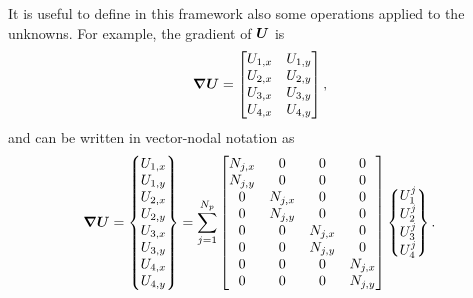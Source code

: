 \documentclass[a4paper,10pt]{article}
\newcommand{\bm}[1]{\text{\boldmath$#1$\unboldmath}}
\newcommand{\Grad}{\bm{\nabla}}
\newcommand{\DiscFunc}[1]{\bm{#1}}
\renewcommand{\u}{\DiscFunc{U}}
\begin{document}
It is useful to define in this framework also some operations applied to the unknowns. For example, the gradient of $\u$ is 
\[
 \Grad \u =\begin{bmatrix}
 U_{1,x} & U_{1,y}\\
 U_{2,x} & U_{2,y}\\
 U_{3,x} & U_{3,y}\\
 U_{4,x} & U_{4,y}
\end{bmatrix},
\]
and can be written in vector-nodal notation as 
\[
 \Grad \u =\begin{Bmatrix}
 U_{1,x} \\
 U_{1,y} \\
 U_{2,x} \\
 U_{2,y} \\
 U_{3,x} \\
 U_{3,y} \\
 U_{4,x} \\
 U_{4,y}
\end{Bmatrix} =
\sum_{j=1}^{N_p} \begin{bmatrix}
                  N_{j,x}   &       0      &       0     &       0       \\ 
                  N_{j,y}   &       0      &       0     &       0       \\ 
                  0         &    N_{j,x}   &       0     &       0       \\ 
                  0         &    N_{j,y}   &       0     &       0       \\ 
                  0         &       0      &    N_{j,x}  &       0       \\ 
                  0         &       0      &    N_{j,y}  &       0       \\ 
                  0         &       0      &       0     &     N_{j,x}   \\ 
                  0         &       0      &       0     &     N_{j,y}   \\ 
                 \end{bmatrix}
                 \begin{Bmatrix}
                    U_1^j\\
                    U_2^j\\
                    U_3^j\\
                    U_4^j  
                 \end{Bmatrix}.            
\]
\end{document}
